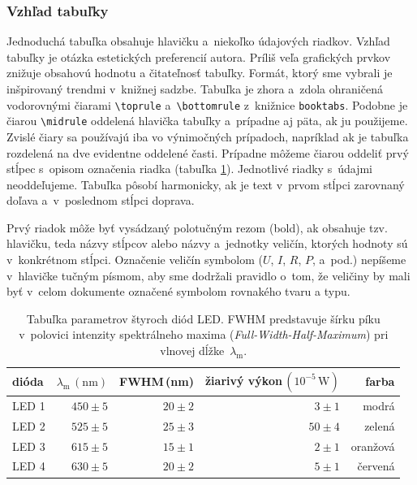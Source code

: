 \subsubsection{Vzhľad tabuľky}
Jednoduchá tabuľka obsahuje hlavičku a~niekoľko
údajových riadkov.
Vzhľad tabuľky je otázka estetických preferencií autora.
Príliš veľa grafických prvkov znižuje obsahovú hodnotu a čitateľnosť tabuľky.
Formát, ktorý sme vybrali je inšpirovaný trendmi
v~knižnej sadzbe.
Tabuľka je zhora a~zdola ohraničená vodorovnými čiarami
\verb|\toprule| a~\verb|\bottomrule| z~knižnice \verb|booktabs|.
Podobne je čiarou \verb|\midrule| oddelená hlavička tabuľky
a~prípadne aj päta, ak ju použijeme.
Zvislé čiary sa používajú iba vo výnimočných prípadoch,
napríklad ak je tabuľka rozdelená na
dve evidentne oddelené časti.
Prípadne môžeme čiarou oddeliť prvý stĺpec s~opisom označenia riadka (tabuľka \ref{tab:LED}).
Jednotlivé riadky s~údajmi neoddeľujeme.
Tabuľka pôsobí harmonicky,
ak je text v~prvom stĺpci zarovnaný doľava
a~v~poslednom stĺpci doprava.

Prvý riadok môže byť vysádzaný polotučným
rezom (bold),
ak obsahuje tzv. hlavičku, teda názvy stĺpcov alebo názvy
a~jednotky veličín, ktorých hodnoty sú v~konkrétnom stĺpci.
Označenie veličín symbolom ($U$, $I$, $R$, $P$, a~pod.)
nepíšeme v~hlavičke tučným písmom,
aby sme dodržali pravidlo o~tom,
že veličiny by mali byť v~celom dokumente označené symbolom
rovnakého tvaru a typu.

\begin{table}[h!]
  \caption{Tabuľka parametrov štyroch diód LED.
  FWHM predstavuje šírku píku v~polovici intenzity
  spektrálneho maxima (\foreignlanguage{english}{\emph{Full-Width-Half-Maximum}}) pri vlnovej dĺžke~$\lambda_\mathrm m$.}
  \label{tab:LED}
  \centering
  \begin{tabular}{@{}l|rrrr@{}}
    \toprule
    dióda & $\lambda_\mathrm m\,(\mathrm{nm})$ & FWHM\,(nm) & žiarivý výkon\,$(10^{-5}\,\mathrm W)$ & farba \\
    \midrule
    LED 1 & $450 \pm 5$ & $20\pm2$ & $3\pm1$ & modrá\\
    LED 2 & $525 \pm 5$ & $25\pm3$ & $50\pm4$ & zelená\\
    LED 3 & $615 \pm 5$ & $15\pm1$ & $2\pm1$ & oranžová\\
    LED 4 & $630 \pm 5$ & $20\pm2$ & $5\pm1$ & červená\\
    \bottomrule
  \end{tabular}
\end{table}

